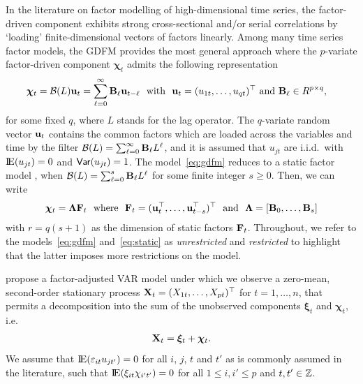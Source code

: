 In the literature on factor modelling of high-dimensional time series, the factor-driven component exhibits strong cross-sectional and/or serial correlations by `loading' finite-dimensional vectors of factors linearly.
Among many time series factor models, the GDFM \citep{forni2000generalized} provides the most general approach where the $p$-variate factor-driven component $\bm\chi_t$ admits the following representation
\begin{align}
    \bm\chi_t &= \mathcal B(L) \mathbf u_t = \sum_{\ell = 0}^\infty \mathbf B_\ell \mathbf u_{t - \ell} \text{ \ with \ } \mathbf u_t = (u_{1t}, \ldots, u_{qt})^\top \text{ and } \mathbf B_\ell \in R^{p \times q}, \label{eq:gdfm}
\end{align}
for some fixed $q$, where $L$ stands for the lag operator. 
The $q$-variate random vector $\mathbf u_t$ contains the common factors which are loaded across the variables and time by the filter $\mathcal B(L) = \sum_{\ell = 0}^\infty \mathbf B_\ell L^\ell$, and it is assumed that $u_{jt}$ are i.i.d.\ with $\E(u_{jt}) = 0$ and $\mathsf{Var}(u_{jt}) = 1$.
The model~\eqref{eq:gdfm} reduces to a static factor model \citep{bai2003, stock2002forecasting, fan2013large}, when $\mathcal B(L) = \sum_{\ell = 0}^s \mathbf B_\ell L^\ell$ for some finite integer $s \ge 0$. Then, we can write 
\begin{align}
\label{eq:static}
    \bm\chi_t = \bm\Lambda \mathbf F_t \text{ \ where \ } \mathbf F_t = (\mathbf u_t^\top, \ldots, \mathbf u_{t - s}^\top)^\top \text{ \ and \ } \bm\Lambda = [\mathbf B_0, \ldots, \mathbf B_s]
\end{align}
with $r = q (s + 1)$ as the dimension of static factors $\mathbf F_t$. 
Throughout, we refer to the models~\eqref{eq:gdfm} and~\eqref{eq:static} as {\it unrestricted} and {\it restricted} to highlight that the latter imposes more restrictions on the model.

\cite{barigozzi2022fnets} propose a factor-adjusted VAR model under which we observe a zero-mean, second-order stationary process $\mathbf X_t = (X_{1t}, \ldots, X_{pt})^\top$ for $t = 1, \ldots, n$, that permits a decomposition into the sum of the unobserved components $\bm\xi_t$ and $\bm\chi_t$, i.e.\
\begin{align}
    \label{eq:model}
    \mathbf X_t = \bm\xi_t + \bm\chi_t.
\end{align}
We assume that $\E(\vep_{it} u_{jt'}) = 0$ for all $i$, $j$, $t$ and $t'$ as is commonly assumed in the literature, such that $\E(\xi_{it} \chi_{i't'}) = 0$ for all $1 \le i, i' \le p$ and $t, t' \in \mathbb{Z}$.

